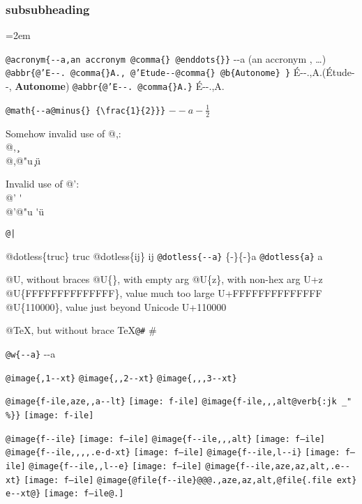\documentclass{book}
\newcommand{\GNUTexinfoplaceholder}[1]{}
\newcommand{\GNUTexinfonopagebreakheading}[2]{\let\clearpage\relax \let\cleardoublepage\relax \let\thispagestyle\GNUTexinfoplaceholder #1{#2}}
\renewcommand{\includegraphics}[1]{\fbox{FIG \detokenize{#1}}}
\begin{document}
\endgroup{}%
\GNUTexinfonopagebreakheading{\subsubsection*}{subsubheading}
\par\begingroup\obeylines\obeyspaces\frenchspacing\leftskip=2em \parskip=0pt \parindent=0pt \ttfamily%


\texttt{@acronym\{{-}{-}a,an accronym @comma\{\} @enddots\{\}\}} {-}{-}a (an accronym , \dots{})
\texttt{@abbr\{@'E{-}{-}. @comma\{\}A., @'Etude{-}{-}@comma\{\} @b\{Autonome\} \}} \'{E}{-}{-}.\@ ,A.\@ (\'{E}tude{-}{-}, \textbf{Autonome})
\texttt{@abbr\{@'E{-}{-}. @comma\{\}A.\}} \'{E}{-}{-}.\@ ,A.\@

\texttt{@math\{{-}{-}a@minus\{\} \{\textbackslash{}frac\{1\}\{2\}\}\}} $--a- {\frac{1}{2}}$




Somehow invalid use of @,:\leavevmode{}\\
@, \c{}
\leavevmode{}\\
@,@"u \c{}\"{u}

Invalid use of @':\leavevmode{}\\
@' \'{}
\leavevmode{}\\
@'@"u \'{}\"{u}

\texttt{@|} 

@dotless\{truc\} truc
@dotless\{ij\} ij
\texttt{@dotless\{{-}{-}a\}} \{-\}\{-\}a
\texttt{@dotless\{a\}} a

@U, without braces @U\{\}, with empty arg 
@U\{z\}, with non-hex arg U+z
@U\{FFFFFFFFFFFFFF\}, value much too large U+FFFFFFFFFFFFFF
@U\{110000\}, value just beyond Unicode U+110000

@TeX, but without brace \TeX{}\texttt{@\#} \#

\texttt{@w\{{-}{-}a\}} \hbox{{-}{-}a}

\texttt{@image\{,1{-}{-}xt\}} 
\texttt{@image\{,,2{-}{-}xt\}} 
\texttt{@image\{,,,3{-}{-}xt\}} 

\texttt{@image\{f-ile,aze,,a{-}{-}lt\}} \texttt{[image: f-ile]}
\texttt{@image\{f-ile,,,alt@verb\{:jk \_" \%\@\}\}} \texttt{[image: f-ile]}

\texttt{@image\{f{-}{-}ile\}} \texttt{[image: f--ile]}
\texttt{@image\{f{-}{-}ile,,,alt\}} \texttt{[image: f--ile]}
\texttt{@image\{f{-}{-}ile,,,,.e-d-xt\}} \texttt{[image: f--ile]}
\texttt{@image\{f{-}{-}ile,l{-}{-}i\}} \texttt{[image: f--ile]}
\texttt{@image\{f{-}{-}ile,,l{-}{-}e\}} \texttt{[image: f--ile]}
\texttt{@image\{f{-}{-}ile,aze,az,alt,.e{-}{-}xt\}} \texttt{[image: f--ile]}
\texttt{@image\{@file\{f{-}{-}ile\}@@@.,aze,az,alt,@file\{.file ext\} e{-}{-}xt@\}} \texttt{[image: f--ile@.]}
\end{document}
